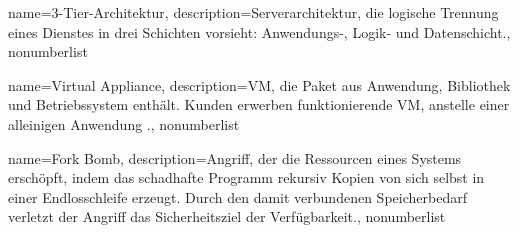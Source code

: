 {%
  name={3-Tier-Architektur},
  description={Serverarchitektur, die logische Trennung eines Dienstes in drei Schichten vorsieht: Anwendungs-, Logik- und Datenschicht.},
  nonumberlist
}

{%
  name={Virtual Appliance},
  description={VM, die Paket aus Anwendung, Bibliothek und Betriebssystem enthält. Kunden erwerben funktionierende VM, anstelle einer alleinigen Anwendung \cite[S.672f.]{tanenbaumOS}.},
  nonumberlist
}

{%
  name={Fork Bomb},
  description={Angriff, der die Ressourcen eines Systems erschöpft, indem das schadhafte Programm rekursiv Kopien von sich selbst in einer Endlosschleife erzeugt. Durch den damit verbundenen Speicherbedarf verletzt der Angriff das Sicherheitsziel der Verfügbarkeit.},
  nonumberlist
}
